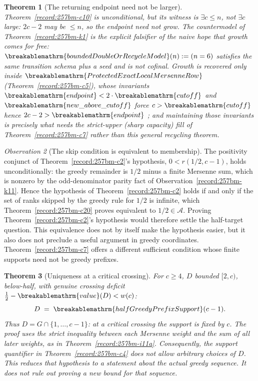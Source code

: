 \documentclass[11pt]{article}
\theoremstyle{plain}
\newtheorem{thm}{Theorem}[section]
\theoremstyle{definition}
\theoremstyle{remark}
\newtheorem{obs}[thm]{Observation}
\newcommand{\lean}[2]{\leanlink{#2}}
\renewcommand{\mathrm}[1]{\ifmmode\breakablemathrm{#1}\else\textrm{#1}\fi}%
\begin{document}
\begin{thm}[The returning endpoint need not be larger]\label{record:257bm-k4}
Theorem~\ref{record:257bm-c10} is unconditional, but its
witness is $\exists c\le n$, not $\exists c$ large: $2c-2$ may be $\le n$, so the endpoint need
not grow. The countermodel of Theorem~\ref{record:257bm-k1} is the
explicit falsifier of the naive hope that growth comes for free:
$\mathrm{boundedDoubleOrRecycleModel}(n):=(n=6)$ satisfies the same transition schema plus a
seed and is not cofinal. Growth is recovered only inside
$\mathrm{ProtectedExactLocalMersenneRow}$ (Theorem~\ref{record:257bm-c5}), whose invariants
$\mathrm{endpoint}<2\cdot\mathrm{cutoff}$ and $\mathrm{new\_above\_cutoff}$ force $c>\mathrm{cutoff}$
hence $2c-2>\mathrm{endpoint}$ ;  and maintaining those invariants is precisely what needs the
strict-upper (sharp capacity) fill of Theorem~\ref{record:257bm-c7} rather than this general recycling theorem.
\end{thm}

\begin{obs}[The skip condition is equivalent to membership]\label{record:257bm-k5}
The positivity conjunct of Theorem~\ref{record:257bm-c2}'s hypothesis,
$0<\ensuremath{r}(1/2,c{-}1)$, holds unconditionally: the greedy remainder is $1/2$ minus a
finite Mersenne sum, which is nonzero by the odd-denominator parity fact of
Observation~\ref{record:257bm-k11}. Hence the hypothesis of Theorem~\ref{record:257bm-c2}
holds if and only if the set of ranks skipped by the greedy rule for $1/2$ is infinite,
which Theorem~\ref{record:257bm-c20} proves equivalent to $1/2\in\ensuremath{\mathcal A}$. Proving Theorem~\ref{record:257bm-c2}'s hypothesis would therefore settle
the half-target question.  This equivalence does not by itself make the
hypothesis easier, but it also does not preclude a useful argument in
greedy coordinates.  Theorem~\ref{record:257bm-c7} offers a different
sufficient condition whose finite supports need not be greedy prefixes.
\par\noindent   \lean{localMersennePrefixValue\_halfGreedy\_lt\_half}{BooleanMobiusCriticalCapacityCofinal.lean:138}
\end{obs}

\begin{thm}[Uniqueness at a critical crossing]\label{record:257rig-k6}
For $c\ge4$, $D$ bounded $[2,c)$, below-half, with genuine crossing deficit
$\tfrac12-\mathrm{value}(D) < \ensuremath{w}(c)$:
\[
D \;=\; \mathrm{halfGreedyPrefixSupport}(c-1).
\]
Thus $D=G\cap\{1,\ldots,c-1\}$: at a critical crossing the support is
fixed by $c$.  The proof uses the strict inequality between each Mersenne
weight and the sum of all later weights, as in
Theorem~\ref{record:257bm-i11a}.  Consequently, the support quantifier in
Theorem~\ref{record:257bm-c4} does not allow arbitrary choices of $D$.
This reduces that hypothesis to a statement about the actual greedy
sequence.  It does not rule out proving a new bound for that sequence.
\end{thm}
\end{document}

